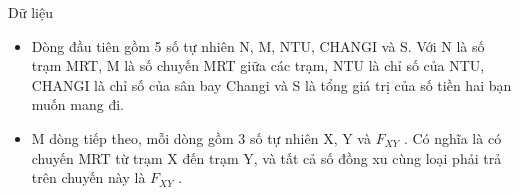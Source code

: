 Dữ liệu
\begin{itemize}
	\item     Dòng đầu tiên gồm 5 số tự nhiên N, M, NTU, CHANGI và S. Với N là số trạm MRT, M là số chuyến MRT giữa các trạm, NTU là chỉ số của NTU, CHANGI là chỉ số của sân bay Changi và S là tổng giá trị của số tiền hai bạn muốn mang đi.   
	\item     M dòng tiếp theo, mỗi dòng gồm 3 số tự nhiên X, Y và $F_{XY}$    . Có nghĩa là có chuyến MRT từ trạm X đến trạm Y, và tất cả số đồng xu cùng loại phải trả trên chuyến này là $F_{XY}$    .   
\end{itemize}